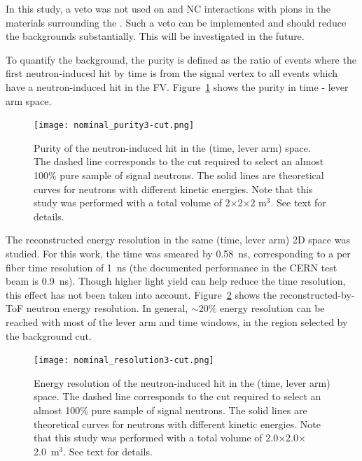 In this study, a veto was not used on  and NC interactions with pions in the materials surrounding the .  Such a veto can be implemented and should reduce the backgrounds substantially.  This will be investigated in the future.

To quantify the background, the purity is defined as the ratio of events where the first neutron-induced hit by time is from the signal vertex to all events which have a neutron-induced hit in the FV. 
Figure~\ref{fig:nominal_purity} shows the purity in time - lever arm space. 
\begin{figure}
\begin{center}
  \texttt{[image: nominal\_purity3-cut.png]}
\caption{\label{fig:nominal_purity} Purity of the neutron-induced hit in the (time, lever arm) space.
The dashed line corresponds to the cut required to select an almost 100\% pure sample of signal neutrons. The solid lines are theoretical curves for neutrons with different kinetic energies.
Note that this study was performed with a total volume of 2$\times$2$\times$2 m$^3$.
See text for details.} 
\end{center}
\end{figure}


The reconstructed energy resolution in the same (time, lever arm) 2D space was studied. For this work, the time was smeared by 0.58~ns, corresponding to a per fiber time resolution of 1~ns (the documented performance in the CERN test beam is 0.9~ns).
Though higher light yield can help reduce the time resolution, this effect has not been taken into account. Figure~\ref{fig:nominal_resolution} shows the reconstructed-by-ToF neutron energy resolution. In general, $\sim 20 \%$ energy resolution can be reached with most of the lever arm and time windows, 
in the region selected by the background cut. \\
\begin{figure}
\begin{center}
  \texttt{[image: nominal\_resolution3-cut.png]}
\caption{\label{fig:nominal_resolution} Energy resolution of the neutron-induced hit in the (time, lever arm) space. 
The dashed line corresponds to the cut required to select an almost 100\% pure sample of signal neutrons. The solid lines are theoretical curves for neutrons with different kinetic energies.
Note that this study was performed with a total volume of 2.0$\times$2.0$\times$2.0~m$^3$.
See text for details.} 
\end{center}
\end{figure}


